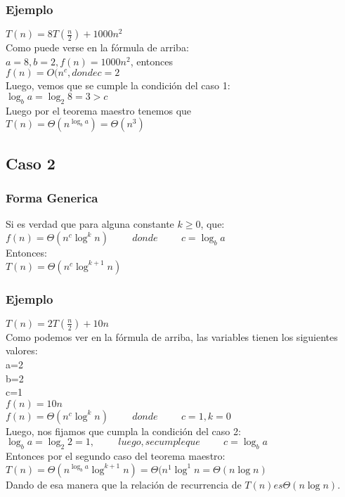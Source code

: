 \documentclass[12pt]{article}
\begin{document}
\subsubsection*{Ejemplo}
$T(n)=8T(\frac{n}{2})+1000n^{2}$\\
Como puede verse en la fórmula de arriba:\\
$a=8, b=2, f(n)=1000n^{2}$, entonces\\
$f(n)=O(n^{c}, donde c=2$\\
Luego, vemos que se cumple la condición del caso 1:\\
$\log_{b}a=\log_{2}8=3>c$ \\
Luego por el teorema maestro tenemos que \\
$T(n)=\Theta(n^{\log_{b}a})=\Theta(n^{3})$\\


\subsection*{Caso 2}
\subsubsection*{Forma Generica}
Si es verdad que para alguna constante $k\geq0$, que:\\
$f(n)=\Theta(n^{c}\log^{k}n) \hspace{1cm} donde \hspace{1cm} c=\log_{b}a$\\
Entonces:\\
$T(n)=\Theta(n^{c}\log^{k+1}n)$\\
\subsubsection*{Ejemplo}
$T(n)=2T(\frac{n}{2})+10n$\\
Como podemos ver en la fórmula de arriba, las variables tienen los siguientes valores:\\
a=2\\
b=2\\
c=1\\
$f(n)=10n$\\
$f(n)=\Theta(n^{c}\log^{k}n) \hspace{1cm} donde \hspace{1cm} c=1,k=0$\\
Luego, nos fijamos que cumpla la condición del caso 2:\\
$\log_{b}a=\log_{2}2=1, \hspace{1cm} luego, se cumple que \hspace{1cm} c=\log_{b}a$\\
Entonces por el segundo caso del teorema maestro:\\
$T(n)=\Theta(n^{\log_{b}a}\log^{k+1}n)=\Theta(n^{1}\log^{1}n=\Theta(n\log n)$\\
Dando de esa manera que la relación de recurrencia de $T(n) es \Theta(n\log n)$.
\end{document}
